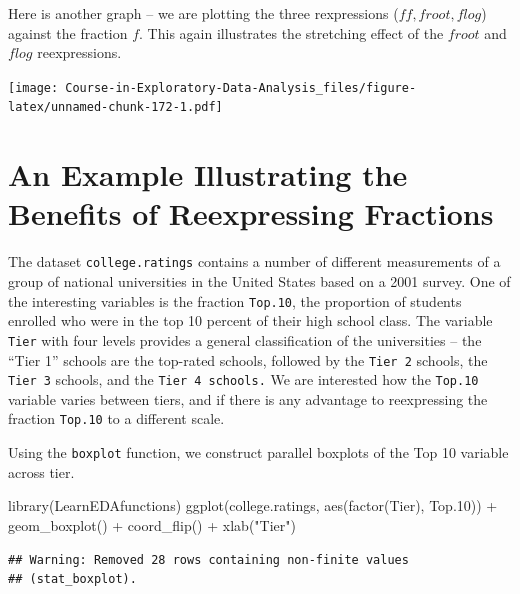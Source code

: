 \documentclass[
]{book}
\newenvironment{Shaded}{\begin{snugshade}}{\end{snugshade}}
\newcommand{\FloatTok}[1]{\textcolor[rgb]{0.00,0.00,0.81}{#1}}
\newcommand{\FunctionTok}[1]{\textcolor[rgb]{0.00,0.00,0.00}{#1}}
\newcommand{\NormalTok}[1]{#1}
\newcommand{\SpecialCharTok}[1]{\textcolor[rgb]{0.00,0.00,0.00}{#1}}
\newcommand{\StringTok}[1]{\textcolor[rgb]{0.31,0.60,0.02}{#1}}
\begin{document}
Here is another graph -- we are plotting the three rexpressions (\(ff, froot, flog\)) against the fraction \(f\). This again illustrates the stretching effect of the \(froot\) and \(flog\) reexpressions.

\texttt{[image: Course-in-Exploratory-Data-Analysis\_files/figure-latex/unnamed-chunk-172-1.pdf]}

\hypertarget{an-example-illustrating-the-benefits-of-reexpressing-fractions}{%
\section{An Example Illustrating the Benefits of Reexpressing Fractions}\label{an-example-illustrating-the-benefits-of-reexpressing-fractions}}

The dataset \texttt{college.ratings} contains a number of different measurements of a group of national universities in the United States based on a 2001 survey.
One of the interesting variables is the fraction \texttt{Top.10}, the proportion of students enrolled who were in the top 10 percent of their high school class. The variable \texttt{Tier} with four levels provides a general classification of the universities -- the ``Tier 1'' schools are the top-rated schools, followed by the \texttt{Tier\ 2} schools, the \texttt{Tier\ 3} schools, and the \texttt{Tier\ 4\ schools.} We are interested how the \texttt{Top.10} variable varies between tiers, and if there is any advantage to reexpressing the fraction \texttt{Top.10} to a different scale.

Using the \texttt{boxplot} function, we construct parallel boxplots of the Top 10 variable across tier.

\begin{Shaded}
\begin{Highlighting}[]
\FunctionTok{library}\NormalTok{(LearnEDAfunctions)}
\FunctionTok{ggplot}\NormalTok{(college.ratings,}
       \FunctionTok{aes}\NormalTok{(}\FunctionTok{factor}\NormalTok{(Tier), Top}\FloatTok{.10}\NormalTok{)) }\SpecialCharTok{+}
  \FunctionTok{geom\_boxplot}\NormalTok{() }\SpecialCharTok{+} \FunctionTok{coord\_flip}\NormalTok{() }\SpecialCharTok{+} \FunctionTok{xlab}\NormalTok{(}\StringTok{"Tier"}\NormalTok{)}
\end{Highlighting}
\end{Shaded}

\begin{verbatim}
## Warning: Removed 28 rows containing non-finite values
## (stat_boxplot).
\end{verbatim}
\end{document}
